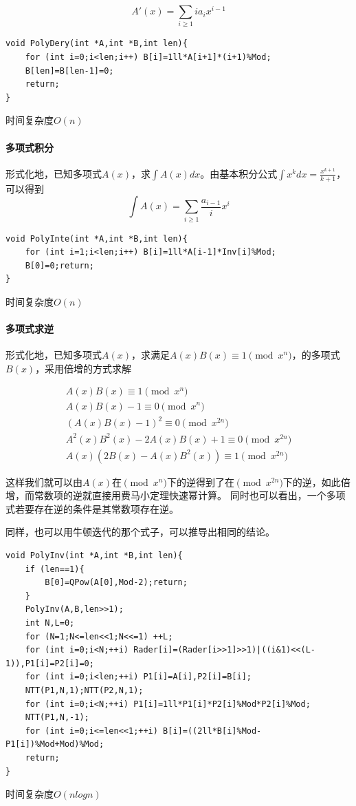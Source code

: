 \documentclass[UTF-8]{ctexart}
\begin{document}
	$$A'(x)=\sum _ {i \ge 1}ia _ {i}x^{i-1}$$
\begin{verbatim}
void PolyDery(int *A,int *B,int len){
    for (int i=0;i<len;i++) B[i]=1ll*A[i+1]*(i+1)%Mod;
    B[len]=B[len-1]=0;
    return;
}
\end{verbatim}
	时间复杂度$O(n)$
	
	\paragraph{多项式积分}形式化地，已知多项式$A(x)$，求$\int A(x)dx$。由基本积分公式$\int x^kdx=\frac{x^{k+1}}{k+1}$，可以得到
	$$\int A(x)=\sum _ {i \ge 1}\frac{a _ {i-1}}{i}x^i$$
\begin{verbatim}
void PolyInte(int *A,int *B,int len){
    for (int i=1;i<len;i++) B[i]=1ll*A[i-1]*Inv[i]%Mod;
    B[0]=0;return;
}
\end{verbatim}
	时间复杂度$O(n)$
	
	\paragraph{多项式求逆}形式化地，已知多项式$A(x)$，求满足$A(x)B(x) \equiv 1 \pmod {x^n} $，的多项式$B(x)$，采用倍增的方式求解
	
	\begin{align}
	A(x)B(x) \equiv 1 \pmod{x^n} \nonumber\\ A(x)B(x)-1 \equiv 0 \pmod{x^n} \nonumber\\ (A(x)B(x)-1)^2 \equiv 0 \pmod {x^{2n}} \nonumber\\ A^2(x)B^2(x)-2A(x)B(x)+1 \equiv 0 \pmod{x^{2n}} \nonumber\\ A(x)(2B(x)-A(x)B^2(x)) \equiv 1 \pmod {x^{2n}}\nonumber
	\end{align}
	
	这样我们就可以由$A(x)$在$\pmod{x^n}$下的逆得到了在$\pmod{x^{2n}}$下的逆，如此倍增，而常数项的逆就直接用费马小定理快速幂计算。  
	同时也可以看出，一个多项式若要存在逆的条件是其常数项存在逆。
	
	同样，也可以用牛顿迭代的那个式子，可以推导出相同的结论。
	
\begin{verbatim}
void PolyInv(int *A,int *B,int len){
    if (len==1){
        B[0]=QPow(A[0],Mod-2);return;
    }
    PolyInv(A,B,len>>1);
    int N,L=0;
    for (N=1;N<=len<<1;N<<=1) ++L;
    for (int i=0;i<N;++i) Rader[i]=(Rader[i>>1]>>1)|((i&1)<<(L-1)),P1[i]=P2[i]=0;
    for (int i=0;i<len;++i) P1[i]=A[i],P2[i]=B[i];
    NTT(P1,N,1);NTT(P2,N,1);
    for (int i=0;i<N;++i) P1[i]=1ll*P1[i]*P2[i]%Mod*P2[i]%Mod;
    NTT(P1,N,-1);
    for (int i=0;i<=len<<1;++i) B[i]=((2ll*B[i]%Mod-P1[i])%Mod+Mod)%Mod;
    return;
}
\end{verbatim}
	时间复杂度$O(nlogn)$
	
\end{document}
